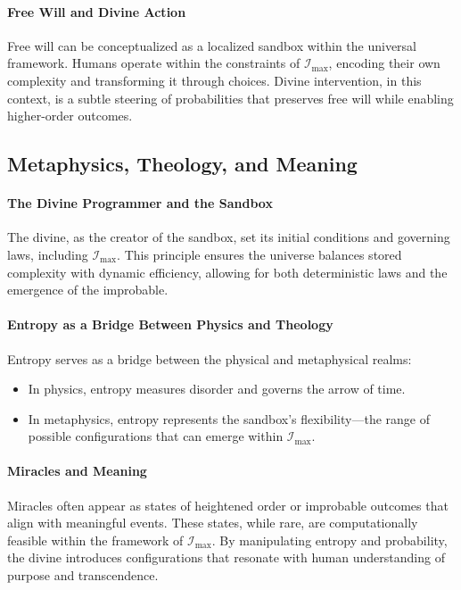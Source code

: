 \documentclass[12pt]{article}
\begin{document}
\paragraph{Free Will and Divine Action}
Free will can be conceptualized as a localized sandbox within the universal framework. Humans operate within the constraints of \(\mathcal{I}_{\text{max}}\), encoding their own complexity and transforming it through choices. Divine intervention, in this context, is a subtle steering of probabilities that preserves free will while enabling higher-order outcomes.

\subsection{Metaphysics, Theology, and Meaning}

\paragraph{The Divine Programmer and the Sandbox}
The divine, as the creator of the sandbox, set its initial conditions and governing laws, including \(\mathcal{I}_{\text{max}}\). This principle ensures the universe balances stored complexity with dynamic efficiency, allowing for both deterministic laws and the emergence of the improbable.

\paragraph{Entropy as a Bridge Between Physics and Theology}
Entropy serves as a bridge between the physical and metaphysical realms:
\begin{itemize}
    \item In physics, entropy measures disorder and governs the arrow of time.
    \item In metaphysics, entropy represents the sandbox's flexibility—the range of possible configurations that can emerge within \(\mathcal{I}_{\text{max}}\).
\end{itemize}

\paragraph{Miracles and Meaning}
Miracles often appear as states of heightened order or improbable outcomes that align with meaningful events. These states, while rare, are computationally feasible within the framework of \(\mathcal{I}_{\text{max}}\). By manipulating entropy and probability, the divine introduces configurations that resonate with human understanding of purpose and transcendence.
\end{document}
